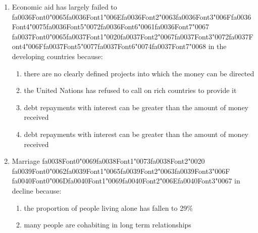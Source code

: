 \documentclass[12pt]{article}
\begin{document}
\begin{enumerate}[label=\arabic*.]
\begin{enumerate}[label=(\alph*)]
    \item impersonal rules
    \item extensive paperwork
    \item hierarchy of officials
    \item Salaries
\end{enumerate}
\item Economic aid has largely failed to {\csname fa0036Font0\endcsname\char"0065}{\csname fa0036Font1\endcsname\char"006E}{\csname fa0036Font2\endcsname\char"0063}{\csname fa0036Font3\endcsname\char"006F}{\csname fa0036Font4\endcsname\char"0075}{\csname fa0036Font5\endcsname\char"0072}{\csname fa0036Font6\endcsname\char"0061}{\csname fa0036Font7\endcsname\char"0067} {\csname fa0037Font0\endcsname\char"0065}{\csname fa0037Font1\endcsname\char"0020}{\csname fa0037Font2\endcsname\char"0067}{\csname fa0037Font3\endcsname\char"0072}{\csname fa0037Font4\endcsname\char"006F}{\csname fa0037Font5\endcsname\char"0077}{\csname fa0037Font6\endcsname\char"0074}{\csname fa0037Font7\endcsname\char"0068} in the developing countries because:
\begin{enumerate}[label=(\alph*)]
    \item there are no clearly defined projects into which the money can be directed
    \item the United Nations has refused to call on rich countries to provide it
    \item debt repayments with interest can be greater than the amount of money received
    \item debt repayments with interest can be greater than the amount of money received
\end{enumerate}
\item Marriage {\csname fa0038Font0\endcsname\char"0069}{\csname fa0038Font1\endcsname\char"0073}{\csname fa0038Font2\endcsname\char"0020} {\csname fa0039Font0\endcsname\char"0062}{\csname fa0039Font1\endcsname\char"0065}{\csname fa0039Font2\endcsname\char"0063}{\csname fa0039Font3\endcsname\char"006F} {\csname fa0040Font0\endcsname\char"006D}{\csname fa0040Font1\endcsname\char"0069}{\csname fa0040Font2\endcsname\char"006E}{\csname fa0040Font3\endcsname\char"0067} in decline because:
\begin{enumerate}[label=(\alph*)]
    \item the proportion of people living alone has fallen to 29\%
    \item many people are cohabiting in long term relationships

\end{enumerate}
\end{enumerate}
\end{document}
